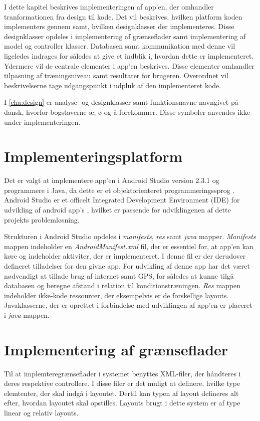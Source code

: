 I dette kapitel beskrives implementeringen af app'en, der omhandler tranformationen fra design til kode. Det vil beskrives, hvilken platform koden implementers gennem samt, hvilken designklasser der implementeres. Disse designklasser opdeles i implementering af grænseflader samt implementering af model og controller klasser. Databasen samt kommunikation med denne vil ligeledes indrages for således at give et indblik i, hvordan dette er implementeret. Ydermere vil de centrale elementer i app'en beskrives. Disse elementer omhandler tilpasning af træningsniveau samt resultater for brugeren. Overordnet vil beskrivelserne tage udgangspunkt i udpluk af den implementeret kode.

I \autoref{cha:design} er analyse- og designklasser samt funktionsnavne navngivet på dansk, hvorfor bogstaverne æ, ø og å forekommer. Disse symboler anvendes ikke under implementeringen.

\section{Implementeringsplatform}
Det er valgt at implementere app'en i Android Studio version 2.3.1 og programmere i Java, da dette er et objektorienteret programmeringssprog \citep{Brahma2015}. Android Studio er et officelt Integrated Development Environment (IDE) for udvikling af android app's \citep{android2017}, hvilket er passende for udviklingenen af dette projekts problemløsning. 

Strukturen i Android Studio opdeles i \textit{manifests}, \textit{res} samt \textit{java} mapper. \textit{Manifests} mappen indeholder en \textit{AndroidManifest.xml} fil, der er essentiel for, at app'en kan køre og indeholder aktiviter, der er implementeret. I denne fil er der derudover defineret tilladelser for den givne app. For udvikling af denne app har det været nødvendigt at tillade brug af internet samt GPS, for således at kunne tilgå databasen og beregne afstand i relation til konditionstræningen. 
\textit{Res} mappen indeholder ikke-kode ressourcer, der eksempelvis er de forskellige layouts.
Javaklasserne, der er oprettet i forbindelse med udviklingen af app'en er placeret i \textit{java} mappen.\citep{android2017}
 

\section{Implementering af grænseflader}
Til at implemteregrænseflader i systemet benyttes XML-filer, der håndteres i deres respektive controllere. I disse filer er det muligt at definere, hvilke type elemtenter, der skal indgå i layoutet. Dertil kan typen af layout defineres alt efter, hvordan layoutet skal opstilles. Layouts brugt i dette system er af type linear og relativ layouts.  

